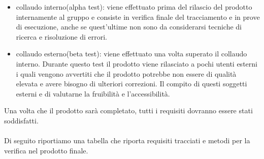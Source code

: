 \begin{itemize}
  \item collaudo interno(alpha test): viene effettuato prima del rilascio
  del prodotto internamente al gruppo e consiste in verifica finale del tracciamento 
  e in prove di esecuzione, anche se quest'ultime non sono da considerarsi tecniche di
  ricerca e risoluzione di errori.
  \item collaudo esterno(beta test): viene effettuato una volta superato il
  collaudo interno. Durante questo test il prodotto viene rilasciato a
  pochi utenti esterni i quali vengono avvertiti che il prodotto potrebbe non essere 
  di qualit\`a elevata e avere bisogno di ulteriori correzioni. 
  Il compito di questi soggetti esterni e di valutarne la fruibilit\`a e l'accessibilit\`a.
\end{itemize}

Una volta che il prodotto sar\`a completato, tutti i requisiti dovranno essere
stati soddisfatti.\\
\\
Di seguito riportiamo una tabella che riporta requisiti tracciati e metodi per
la verifica nel prodotto finale.

